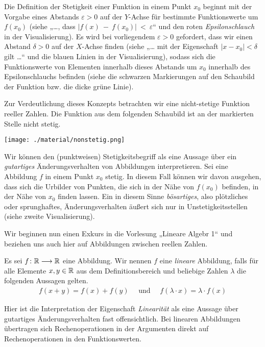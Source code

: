 
Die Definition der Stetigkeit einer Funktion in einem Punkt $x_0$ beginnt mit
der Vorgabe eines Abstands $\varepsilon > 0$ auf der $Y$-Achse für bestimmte
Funktionswerte um $f(x_0)$ (siehe „…, dass $|f(x)~-~f(x_0)|~<~\varepsilon$“ und
den roten \emph{Epsilonschlauch} in der Visualisierung). Es wird bei
vorliegendem $\varepsilon > 0$ gefordert, dass wir einen Abstand $\delta > 0$
auf der $X$-Achse finden (siehe „… mit der Eigenschaft $|x - x_{0}| < \delta$
gilt …“ und die blauen Linien in der Visualisierung), sodass sich die
Funktionswerte von Elementen innerhalb dieses Abstands um $x_0$ innerhalb des
Epsilonschlauchs befinden (siehe die schwarzen Markierungen auf den Schaubild
der Funktion bzw. die dicke grüne Linie).

Zur Verdeutlichung dieses Konzepts betrachten wir eine nicht-stetige Funktion
reeller Zahlen. Die Funktion aus dem folgenden Schaubild ist an der markierten
Stelle nicht stetig.


\begin{center}
  \texttt{[image: ./material/nonstetig.png]}
\end{center}


Wir können den (punktweisen) Stetigkeitsbegriff als eine Aussage über ein
\emph{gutartiges} Änderungsverhalten von Abbildungen interpretieren. Sei eine
Abbildung $f$ in einem Punkt $x_0$ stetig. In diesem Fall können wir davon
ausgehen, dass sich die Urbilder von Punkten, die sich in der Nähe von $f(x_0)$
befinden, in der Nähe von $x_0$ finden lassen. Ein in diesem Sinne
\emph{bösartiges}, also plötzliches oder sprunghaftes, Änderungsverhalten äußert
sich nur in Unstetigkeitsstellen (siehe zweite Visualisierung).

Wir beginnen nun einen Exkurs in die Vorlesung „Lineare Algebr 1“ und beziehen
uns auch hier auf Abbildungen zwischen reellen Zahlen.

\begin{defin}
  Es sei $f\colon \mathbb R \longrightarrow \mathbb R$ eine Abbildung. Wir nennen $f$ eine \emph{lineare}
  Abbildung, falls für alle Elemente $x, y \in \mathbb R$ aus dem Definitionsbereich
  und beliebige Zahlen $\lambda$ die folgenden Aussagen gelten.
  \begin{align*}
    f(x + y) = f(x) + f(y) \quad \text{ und } \quad f(\lambda \cdot x) = \lambda \cdot f(x)
  \end{align*}
\end{defin}

Hier ist die Interpretation der Eigenschaft \emph{Linearität} als eine Aussage
über gutartiges Änderungsverhalten fast offensichtlich. Bei linearen Abbildungen
übertragen sich Rechenoperationen in der Argumenten direkt auf Rechenoperationen
in den Funktionswerten. 
